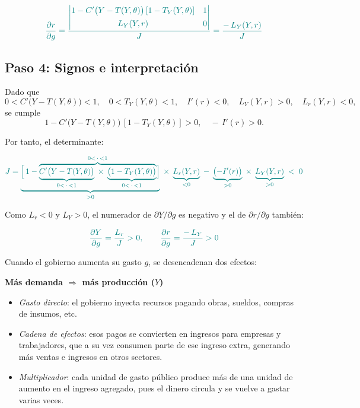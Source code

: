 \documentclass{article}
\begin{document}
\[
\color{teal}
\frac{\partial r}{\partial g}
= \frac{
\begin{vmatrix}
1 - C'\bigl(Y - T(Y,\theta)\bigr)\,[1 - T_Y(Y,\theta)] & 1 \\[4pt]
L_Y(Y,r)                                              & 0
\end{vmatrix}
}{J}
= \frac{-\,L_Y(Y,r)}{J}
\]
\subsection*{Paso 4: Signos e interpretación}

Dado que
\[
0 < C'\bigl(Y - T(Y,\theta)\bigr) < 1,
\quad
0 < T_Y(Y,\theta) < 1,
\quad
I'(r) < 0,
\quad
L_Y(Y,r) > 0,
\quad
L_r(Y,r) < 0,
\]
se cumple
\[
1 - C'\bigl(Y - T(Y,\theta)\bigr)\,[1 - T_Y(Y,\theta)] > 0,
\quad
-\,I'(r) > 0.
\]

Por tanto, el determinante:

\[
\color{teal}
J
= 
\underbrace{\Bigl[\,1 
  - 
  \overbrace{%
    \underbrace{C'\bigl(Y - T(Y,\theta)\bigr)}_{0< \,\cdot\, <1}
    \;\times\;
    \underbrace{\bigl(1 - T_Y(Y,\theta)\bigr)}_{0< \,\cdot\, <1}
  }^{0 < \,\cdot\, < 1}
\Bigr]}_{>0}
\;\times\;
\underbrace{L_r(Y,r)}_{<0}
\;-\;
\underbrace{\bigl(-I'(r)\bigr)}_{>0}
\;\times\;
\underbrace{L_Y(Y,r)}_{>0}
\;<\;0
\]

Como \(L_r<0\) y \(L_Y>0\), el numerador de \(\partial Y/\partial g\) es negativo y el de \(\partial r/\partial g\) también:

\[
\color{teal}
\frac{\partial Y}{\partial g}
= \frac{L_r}{J}
>0,
\qquad
\frac{\partial r}{\partial g}
= \frac{-\,L_Y}{J}
>0
\]

\medskip

Cuando el gobierno aumenta su gasto \(g\), se desencadenan dos efectos:

\bigskip

\noindent
\textbf{\color{teal}Más demanda \(\Rightarrow\) más producción (\(Y\))}

\begin{itemize}
  \item \emph{\color{teal}Gasto directo}: el gobierno inyecta recursos pagando obras, sueldos, compras de insumos, etc.
  \item \emph{\color{teal}Cadena de efectos}: esos pagos se convierten en ingresos para empresas y trabajadores, que a su vez consumen parte de ese ingreso extra, generando más ventas e ingresos en otros sectores.
  \item \emph{\color{teal}Multiplicador}: cada unidad de gasto público produce más de una unidad de aumento en el ingreso agregado, pues el dinero circula y se vuelve a gastar varias veces.
\end{itemize}
\end{document}
